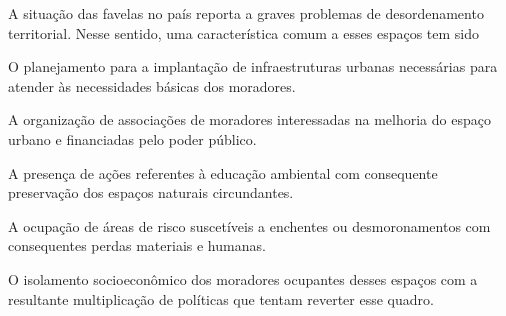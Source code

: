 \questao
{}
A situação das favelas no país reporta a graves problemas de desordenamento territorial. Nesse sentido, uma característica comum a esses espaços tem sido
\begin{alternativas}
\item O planejamento para a implantação de infraestruturas urbanas necessárias para atender às necessidades básicas dos moradores.
\item A organização de associações de moradores interessadas na melhoria do espaço urbano e financiadas pelo poder público.
\item A presença de ações referentes à educação ambiental com consequente preservação dos espaços naturais circundantes.
\item A ocupação de áreas de risco suscetíveis a enchentes ou desmoronamentos com consequentes perdas materiais e humanas.
\item O isolamento socioeconômico dos moradores ocupantes desses espaços com a resultante multiplicação de políticas que tentam reverter esse quadro.
\end{alternativas}

